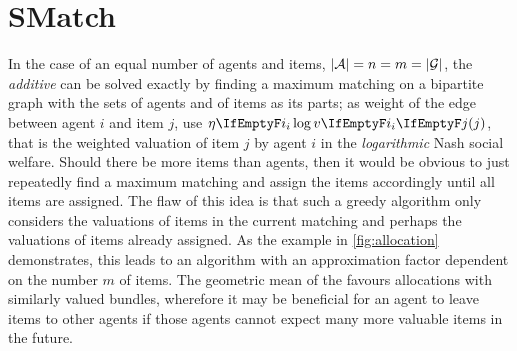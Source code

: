 \section{SMatch}
\label{sec:smatch}

In the case of an equal number of agents and items, \ie{} \(\vert\mathcal{A}\vert = n = m = \vert\mathcal{G}\vert\), the \emph{additive} \NSW{} can be solved exactly by finding a maximum matching on a bipartite graph with the sets of agents and of items as its parts;
as weight of the edge between agent \(i\) and item \(j\), use \(\weight \log \valuations[j]\), that is the weighted valuation of item \(j\) by agent \(i\) in the \emph{logarithmic} Nash social welfare.
Should there be more items than agents, then it would be obvious to just repeatedly find a maximum matching and assign the items accordingly until all items are assigned.
The flaw of this idea is that such a greedy algorithm only considers the valuations of items in the current matching and perhaps the valuations of items already assigned.
As the example in \cref{fig:allocation} demonstrates, this leads to an algorithm with an approximation factor dependent on the number \(m\) of items.
The geometric mean of the \NSW{} favours allocations with similarly valued bundles, wherefore it may be beneficial for an agent to leave items to other agents if those agents cannot expect many more valuable items in the future.


